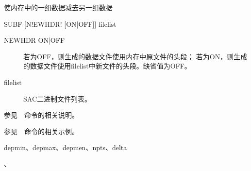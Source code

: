 \label{cmd:subf}

使内存中的一组数据减去另一组数据

\begin{SACSTX}
SUBF [N!EWHDR! [ON|OFF]] filelist
\end{SACSTX}

\begin{description}
\item [NEWHDR ON|OFF] 若为OFF，则生成的数据文件使用内存中原文件的头段；
    若为ON，则生成的数据文件使用filelist中新文件的头段。缺省值为OFF。
\item [filelist] SAC二进制文件列表。
\end{description}

参见~~命令的相关说明。

参见~~命令的相关示例。

depmin、depmax、depmen、npts、delta

、
